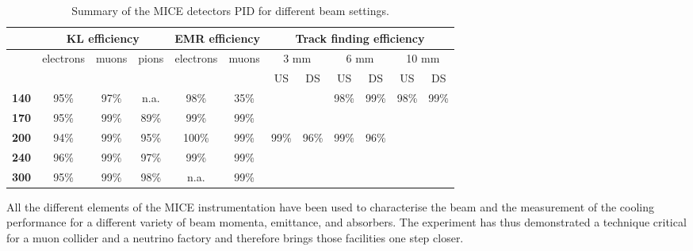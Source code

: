 \begin{table}[htb!]
\begin{tabular}{c|ccc|cc|cc|cc|cc}
 &
  \multicolumn{3}{c|}{\textbf{KL efficiency}} &
  \multicolumn{2}{c|}{\textbf{EMR efficiency}} &
  \multicolumn{6}{c}{\textbf{Track finding efficiency}} \\ 
  \hline
 &
  \multirow{2}{*}{electrons} &
  \multirow{2}{*}{muons} &
  \multirow{2}{*}{pions} &
  \multirow{2}{*}{electrons} &
  \multirow{2}{*}{muons} &
  \multicolumn{2}{c|}{3 mm} &
  \multicolumn{2}{c|}{6 mm} &
  \multicolumn{2}{c}{10 mm} \\  
             &      &      &      &       &      & US   & DS   & US   & DS   & US   & DS   \\ \hline
\textbf{140} & 95\% & 97\% & n.a. & 98\%  & 35\% &      &      & 98\% & 99\% & 98\% & 99\% \\ \hline
\textbf{170} & 95\% & 99\% & 89\% & 99\%  & 99\% &      &      &      &      &      &      \\ \hline
\textbf{200} & 94\% & 99\% & 95\% & 100\% & 99\% & 99\% & 96\% & 99\% & 96\% &      &      \\ \hline
\textbf{240} & 96\% & 99\% & 97\% & 99\%  & 99\% &      &      &      &      &      &      \\ \hline
\textbf{300} & 95\% & 99\% & 98\% & n.a.  & 99\% &      &      &      &      &      &     
\end{tabular}
	\caption{Summary of the MICE detectors PID for different beam settings.}
	\label{tab:pid2}
\end{table}
All the different elements of the MICE instrumentation have been used to characterise the beam and the measurement of the cooling performance for a different variety of beam momenta, emittance, and absorbers.
The experiment has thus demonstrated a technique critical for a muon collider and a neutrino factory and therefore brings those facilities one step closer.
